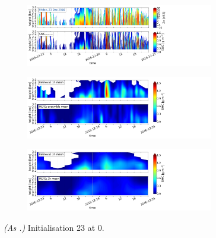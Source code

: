 \begin{figure}[H]%
	\centering
	\begin{subfigure}[t]{1.05\textwidth}
		\centering
		\includegraphics[trim={0.cm 2.2cm 19.cm 0.5cm},clip,width=0.9\textwidth]{./fig_obs_ret/20161223}
		\caption{}\label{fig:SWC:ret_23}
	\end{subfigure}
	\begin{subfigure}[t]{1.05\textwidth}
		\centering
		\includegraphics[trim={0.cm 2.2cm 19.cm 0.5cm},clip,width=0.9\textwidth]{./fig_vert_SWC_EM/20161223}
		\caption{}\label{fig:SWC_EM:23}
	\end{subfigure}
	\begin{subfigure}[t]{1.05\textwidth}
		\centering
		\includegraphics[trim={0.cm 0.8cm 19.cm 0.5cm},clip,width=0.9\textwidth]{./fig_vert_SWC_3h/20161223}
		\caption{}\label{fig:SWC3h:23}
	\end{subfigure}
	\caption{\textit{(As .)} Initialisation \SI{23}{\dec} at \SI{0}{\UTC}.}\label{fig:SWC23}
\end{figure}

